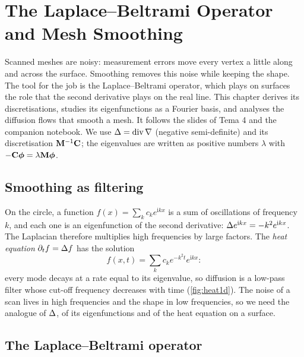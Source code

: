 \chapter{The Laplace--Beltrami Operator and Mesh Smoothing}\label{ch:smooth}

Scanned meshes are noisy: measurement errors move every vertex a little along and across the
surface. Smoothing removes this noise while keeping the shape. The tool for the job is the
Laplace--Beltrami operator, which plays on surfaces the role that the second derivative plays on
the real line. This chapter derives its discretisations, studies its eigenfunctions as a Fourier
basis, and analyses the diffusion flows that smooth a mesh. It follows the slides of Tema 4 and the
companion notebook. We use $\Delta=\operatorname{div}\nabla$ (negative semi-definite) and its discretisation
$\mathbf{M}^{-1}\mathbf{C}$; the eigenvalues are written as positive numbers $\lambda$ with
$-\mathbf{C}\boldsymbol{\phi}=\lambda\mathbf{M}\boldsymbol{\phi}$.

\section{Smoothing as filtering}

On the circle, a function $f(x)=\sum_kc_ke^{\mathrm ikx}$ is a sum of oscillations of frequency
$k$, and each one is an eigenfunction of the second derivative:
$\Delta e^{\mathrm ikx}=-k^2e^{\mathrm ikx}$. The Laplacian therefore multiplies high frequencies by
large factors. The \emph{heat equation} $\partial_tf=\Delta f$ has the solution
\begin{equation}
f(x,t)=\sum_kc_ke^{-k^2t}e^{\mathrm ikx}:
\end{equation}
every mode decays at a rate equal to its eigenvalue, so diffusion is a low-pass filter whose cut-off
frequency decreases with time (\cref{fig:heat1d}). The noise of a scan lives in high frequencies
and the shape in low frequencies, so we need the analogue of $\Delta$, of its eigenfunctions and of
the heat equation on a surface.


\section{The Laplace--Beltrami operator}

